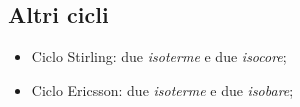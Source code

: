 \subsection{Altri cicli}

\begin{itemize}
    \item Ciclo Stirling: due \emph{isoterme} e due \emph{isocore};
    \item Ciclo Ericsson: due \emph{isoterme} e due \emph{isobare};
\end{itemize}
